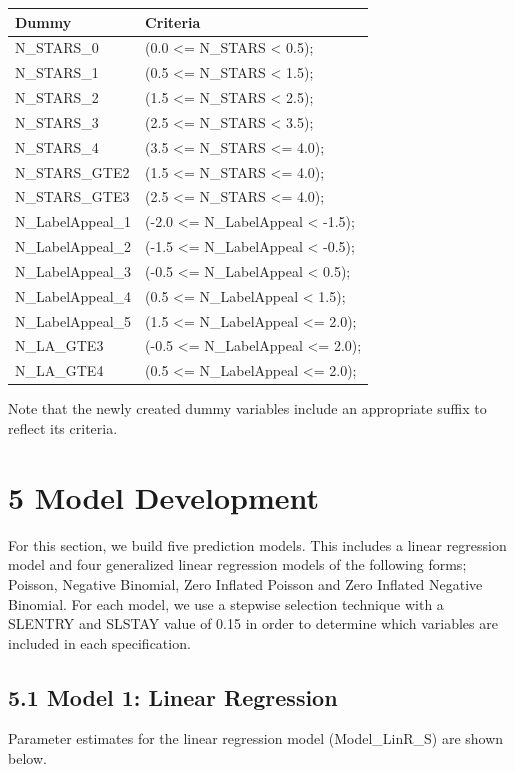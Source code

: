 \documentclass[]{article}
\begin{document}
\begin{longtable}[]{@{}ll@{}}
\toprule
Dummy & Criteria\tabularnewline
\midrule
\endhead
N\_STARS\_0 & (0.0 \textless{}= N\_STARS \textless{}
0.5);\tabularnewline
N\_STARS\_1 & (0.5 \textless{}= N\_STARS \textless{}
1.5);\tabularnewline
N\_STARS\_2 & (1.5 \textless{}= N\_STARS \textless{}
2.5);\tabularnewline
N\_STARS\_3 & (2.5 \textless{}= N\_STARS \textless{}
3.5);\tabularnewline
N\_STARS\_4 & (3.5 \textless{}= N\_STARS \textless{}=
4.0);\tabularnewline
N\_STARS\_GTE2 & (1.5 \textless{}= N\_STARS \textless{}=
4.0);\tabularnewline
N\_STARS\_GTE3 & (2.5 \textless{}= N\_STARS \textless{}=
4.0);\tabularnewline
N\_LabelAppeal\_1 & (-2.0 \textless{}= N\_LabelAppeal \textless{}
-1.5);\tabularnewline
N\_LabelAppeal\_2 & (-1.5 \textless{}= N\_LabelAppeal \textless{}
-0.5);\tabularnewline
N\_LabelAppeal\_3 & (-0.5 \textless{}= N\_LabelAppeal \textless{}
0.5);\tabularnewline
N\_LabelAppeal\_4 & (0.5 \textless{}= N\_LabelAppeal \textless{}
1.5);\tabularnewline
N\_LabelAppeal\_5 & (1.5 \textless{}= N\_LabelAppeal \textless{}=
2.0);\tabularnewline
N\_LA\_GTE3 & (-0.5 \textless{}= N\_LabelAppeal \textless{}=
2.0);\tabularnewline
N\_LA\_GTE4 & (0.5 \textless{}= N\_LabelAppeal \textless{}=
2.0);\tabularnewline
\bottomrule
\end{longtable}

Note that the newly created dummy variables include an appropriate
suffix to reflect its criteria.

\section{5 Model Development}\label{model-development}

For this section, we build five prediction models. This includes a
linear regression model and four generalized linear regression models of
the following forms; Poisson, Negative Binomial, Zero Inflated Poisson
and Zero Inflated Negative Binomial. For each model, we use a stepwise
selection technique with a SLENTRY and SLSTAY value of 0.15 in order to
determine which variables are included in each specification.

\subsection{5.1 Model 1: Linear
Regression}\label{model-1-linear-regression}

Parameter estimates for the linear regression model (Model\_LinR\_S) are
shown below.
\end{document}
